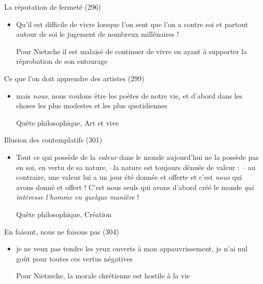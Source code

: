 \documentclass[french,a4paper,11pt,answers]{exam}
\newcommand{\cit}[2]{\og #1 \fg{} \begin{solution}{ #2 }\end{solution}} %
\begin{document}
	\begin{cadre}{La réputation de fermeté (296)}
		\begin{itemize}
			\item \cit{Qu'il est difficile de vivre lorsque l'on sent que l'on a contre soi et partout autour de soi le jugement de nombreux millénaires !}
				{Pour Nietzche il est malaisé de continuer de vivre en ayant à supporter la réprobation de son entourage}
		\end{itemize}
	\end{cadre}

	\begin{cadre}{Ce que l'on doit apprendre des artistes (299)}
		\begin{itemize}
			\item \cit{mais \emph{nous}, nous voulons être les poètes de notre vie, et d'abord dans les choses les plus modestes et les plus quotidiennes}
				{Quête philosophique, Art et vive}
		\end{itemize}
	\end{cadre}
	\begin{cadre}{Illusion des contemplatifs (301)}
		\begin{itemize}
			\item \cit{Tout ce qui possède de la \emph{valeur} dans le monde aujourd'hui ne la possède pas en soi, en vertu de sa nature, --la nature est toujours dénuée de valeur : -- au contraire, une valeur lui a un jour été donnée et offerte et c'est \emph{nous} qui avons donné et offert ! C'est nous seuls qui avons d'abord créé le monde \emph{qui intéresse l'homme en quelque manière} !}
				{Quête philosophique, Création}
		\end{itemize}
	\end{cadre}
	
	\begin{cadre}{En faisant, nous ne faisons pas (304)}
		\begin{itemize}
			\item \cit{je ne veux pas tendre les yeux ouverts à mon appauvrissement, je n'ai nul goût pour toutes ces vertus négatives}
				{Pour Nietzsche, la morale chrétienne est hostile à la vie}
		\end{itemize}
	\end{cadre}
	
\end{document}
